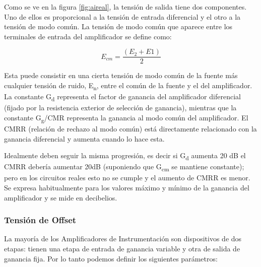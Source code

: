 Como se ve en la figura \ref{fig:aireal}, la tensión de salida tiene dos componentes. Uno de ellos es proporcional a la tensión de entrada diferencial y el otro a la tensión de modo común. La tensión de modo común que aparece entre los terminales de entrada del amplificador se define como: 

\begin{equation}\label{eq6}
E_{cm} = \frac{(E_{2}+E{1})}{2}
\end{equation}

Esta puede consistir en una cierta tensión de modo común de la fuente más cualquier tensión de ruido, E\textsubscript{n}, entre el común de la fuente y el del amplificador. La constante G\textsubscript{d} representa el factor de ganancia del amplificador diferencial (fijado por la resistencia exterior de selección de ganancia), mientras que la constante G\textsubscript{g}/CMR representa la ganancia al modo común del amplificador. El CMRR (relación de rechazo al modo común) está directamente relacionado con la ganancia diferencial y aumenta cuando lo hace esta. 

Idealmente deben seguir la misma progresión, es decir si G\textsubscript{d} aumenta 20 dB el CMRR debería aumentar 20dB (suponiendo que G\textsubscript{cm} se mantiene constante); pero en los circuitos reales esto no se cumple y el aumento de CMRR es menor. Se expresa habitualmente para los valores máximo y mínimo de la ganancia del amplificador y se mide en decibelios.


\subsubsection{Tensión de Offset} %
\label{tension_off}
La mayoría de los Amplificadores de Instrumentación son dispositivos de dos etapas: tienen una etapa de entrada de ganancia variable y otra de salida de ganancia fija. Por lo tanto podemos definir los siguientes parámetros:

